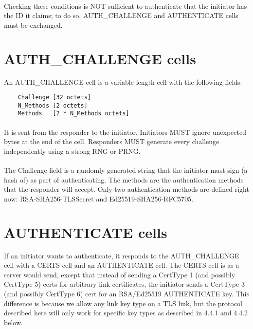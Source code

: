 \paragraph{}
Checking these conditions is NOT sufficient to authenticate that the
initiator has the ID it claims; to do so, AUTH\_CHALLENGE and AUTHENTICATE cells
must be exchanged.

\section{AUTH\_CHALLENGE cells}

An AUTH\_CHALLENGE cell is a variable-length cell with the following
fields:

\begin{verbatim}
    Challenge [32 octets]
    N_Methods [2 octets]
    Methods   [2 * N_Methods octets]
\end{verbatim}

\paragraph{}
It is sent from the responder to the initiator. Initiators MUST
ignore unexpected bytes at the end of the cell. Responders MUST
generate every challenge independently using a strong RNG or PRNG.

\paragraph{}
The Challenge field is a randomly generated string that the
initiator must sign (a hash of) as part of authenticating. The
methods are the authentication methods that the responder will
accept. Only two authentication methods are defined right now:
RSA-SHA256-TLSSecret and Ed25519-SHA256-RFC5705.

\section{AUTHENTICATE cells}

If an initiator wants to authenticate, it responds to the
AUTH\_CHALLENGE cell with a CERTS cell and an AUTHENTICATE cell.
The CERTS cell is as a server would send, except that instead of
sending a CertType 1 (and possibly CertType 5) certs for arbitrary link
certificates, the initiator sends a CertType 3 (and possibly
CertType 6) cert for an RSA/Ed25519 AUTHENTICATE key.
This difference is because we allow any link key type on a TLS
link, but the protocol described here will only work for specific key
types as described in 4.4.1 and 4.4.2 below.

